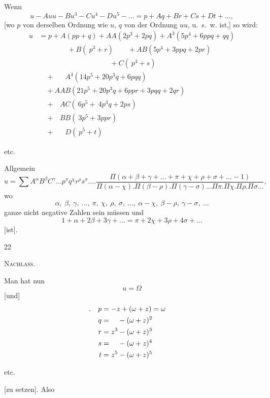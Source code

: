 Wenn
\[
u-Auu-Bu^3-Cu^4-Du^5-\ldots=p+Aq+Br+Cs+Dt+\ldots,
\]
[wo $p$ von derselben Ordnung wie $u$, $q$ von der Ordnung $uu$, u.~s.~w. ist,] so wird:
\[
\begin{aligned}
u&=p+A(pp+q)+AA(2p^3+2pq)+A^3(5p^4+6ppq+qq)\\
&\qquad\qquad+B(\ p^3+r)\qquad+AB(5p^4+3ppq+2pr)\\
&\qquad\qquad\qquad\qquad\qquad+C(\ p^4+s)\\
&\quad+\phantom{AA}A^4(14p^5+20p^3q+6pqq)\\
&\quad+AAB(21p^5+20p^3q+6ppr+3pqq+2qr)\\
&\quad+\phantom{A}AC(\ 6p^5+\ 4p^3q+2ps)\\
&\quad+\phantom{A}BB(\ 3p^5+3ppr)\\
&\quad+\phantom{AA}D(\ p^5+t)
\end{aligned}
\]
\begin{center}etc.\end{center}
Allgemein
\[
u=\sum A^\alpha B^\beta C^\gamma\ldots p^\pi q^\chi r^\rho s^\sigma\ldots.
\frac{\Pi(\alpha+\beta+\gamma+\ldots+\pi+\chi+\rho+\sigma+\ldots-1)}{\Pi(\alpha-\chi).\Pi(\beta-\rho).\Pi(\gamma-\sigma)\ldots\Pi\pi.\Pi\chi.\Pi\rho.\Pi\sigma\ldots},
\]
wo
\[
\alpha,\ \beta,\ \gamma,\ \ldots,\ \pi,\ \chi,\ \rho,\ \sigma,\ \ldots,\ \alpha-\chi,\ \beta-\rho,\ \gamma-\sigma,\ \ldots
\]
ganze nicht negative Zahlen sein müssen und
\[
1+\alpha+2\beta+3\gamma+\ldots=\pi+2\chi+3\rho+4\sigma+\ldots
\]
[ist].
\par\endgroup
\vfill{}\hfill22\hspace*{2cm}\par
\clearpage
{}\hfill\textsc{Nachlass.}\hfill\mbox{}\par\medskip
Man hat nun
\[
u=\Omega
\]
[und]
\[
\begin{aligned}
\rlap{\hspace{-1.3em}.}p&=-z+(\omega+z)=\omega\\
q&=\phantom{z^3}-(\omega+z)^2\\
r&=z^3-(\omega+z)^3\\
s&=\phantom{z^3}-(\omega+z)^4\\
t&=z^5-(\omega+z)^5
\end{aligned}
\]
\begin{center}etc.\end{center}
[zu setzen]. Also
\begingroup\small
